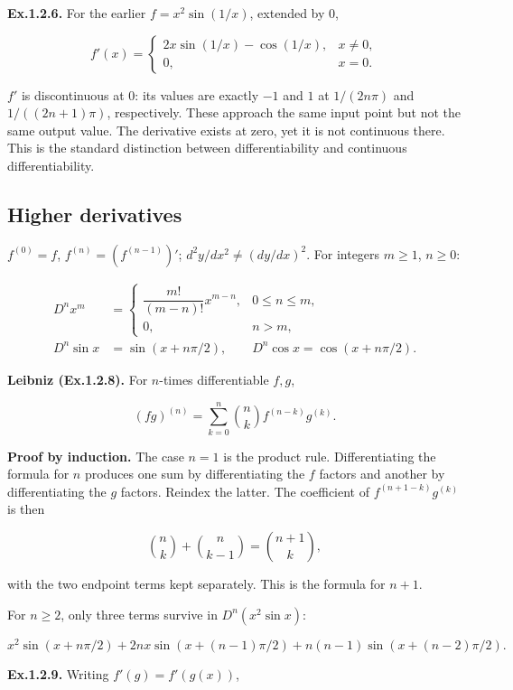 \documentclass[11pt,a4paper]{article}
\begin{document}
\textbf{Ex.1.2.6.} For the earlier \(f=x^2\sin(1/x)\), extended by
\(0\),

\[
f'(x)=\begin{cases}2x\sin(1/x)-\cos(1/x),&x\ne0,\\0,&x=0.\end{cases}
\]

\(f'\) is discontinuous at \(0\): its values are exactly \(-1\) and
\(1\) at \(1/(2n\pi)\) and \(1/((2n+1)\pi)\), respectively. These
approach the same input point but not the same output value. The
derivative exists at zero, yet it is not continuous there. This is the
standard distinction between differentiability and continuous
differentiability.

\subsection{Higher derivatives}\label{higher-derivatives}

\(f^{(0)}=f\), \(f^{(n)}=(f^{(n-1)})'\); \(d^2y/dx^2\ne(dy/dx)^2\). For
integers \(m\ge1\), \(n\ge0\):

\[
\begin{aligned}
D^n x^m&=\begin{cases}\dfrac{m!}{(m-n)!}x^{m-n},&0\le n\le m,\\0,&n>m,\end{cases}\\
D^n\sin x&=\sin(x+n\pi/2),\qquad D^n\cos x=\cos(x+n\pi/2).
\end{aligned}
\]

\textbf{Leibniz (Ex.1.2.8).} For \(n\)-times differentiable \(f,g\),

\[
(fg)^{(n)}=\sum_{k=0}^n\binom nk f^{(n-k)}g^{(k)}.
\]

\textbf{Proof by induction.} The case \(n=1\) is the product rule.
Differentiating the formula for \(n\) produces one sum by
differentiating the \(f\) factors and another by differentiating the
\(g\) factors. Reindex the latter. The coefficient of
\(f^{(n+1-k)}g^{(k)}\) is then

\[
\binom nk+\binom n{k-1}=\binom{n+1}k,
\]

with the two endpoint terms kept separately. This is the formula for
\(n+1\).

For \(n\ge2\), only three terms survive in \(D^n(x^2\sin x)\):

\[
x^2\sin(x+n\pi/2)+2nx\sin(x+(n-1)\pi/2)
+n(n-1)\sin(x+(n-2)\pi/2).
\]

\textbf{Ex.1.2.9.} Writing \(f'(g)=f'(g(x))\),
\end{document}
